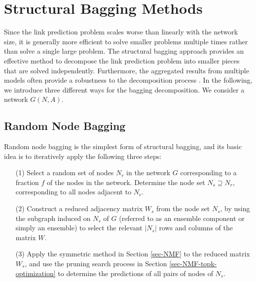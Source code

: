 \section{Structural Bagging Methods}
\label{sec-bagging}
Since the link prediction problem scales worse than
linearly with the network size, it is generally more efficient to
solve smaller problems multiple times rather than solve a single
large problem.
The structural bagging approach provides an effective method to decompose
the link prediction problem into smaller pieces that are solved
independently.
Furthermore, the aggregated results from multiple models often
provide a robustness to the decomposition process  \cite{Breiman96b-1996}. In the
following, we introduce three different ways for the bagging decomposition.
We consider a network $G(N, A)$.


\subsection{Random Node Bagging}

Random node bagging is the simplest form of structural bagging, and its basic
idea is to iteratively apply the following three steps:


\begin{enumerate}

\item[(1)] Select a random set of nodes $N_r$ in the network $G$ corresponding to
a fraction $f$ of the nodes in the network. Determine the node set
$N_s \supseteq N_r$, corresponding to all nodes adjacent to $N_r$.


\item[(2)]  Construct a reduced adjacency matrix $W_s$ from the node set $N_s$, by using the subgraph
induced on $N_s$ of $G$ (referred to as an ensemble component or simply an ensemble) to select the relevant $|N_s|$ rows and columns of the matrix $W$.

\item[(3)]  Apply the symmetric \NMF method in Section \ref{sec-NMF} to the reduced matrix $W_s$, and use the  pruning search
process in Section \ref{sec-NMF-topk-optimization} to determine the predictions of all pairs of nodes of $N_s$.
\end{enumerate}



